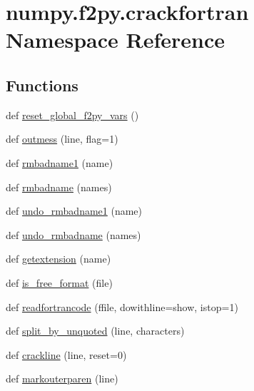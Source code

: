 \hypertarget{namespacenumpy_1_1f2py_1_1crackfortran}{}\section{numpy.\+f2py.\+crackfortran Namespace Reference}
\label{namespacenumpy_1_1f2py_1_1crackfortran}
\subsection*{Functions}
\begin{DoxyCompactItemize}
\item 
def \hyperlink{namespacenumpy_1_1f2py_1_1crackfortran_a33135ace878a349b007af87808e8f2fa}{reset\+\_\+global\+\_\+f2py\+\_\+vars} ()
\item 
def \hyperlink{namespacenumpy_1_1f2py_1_1crackfortran_af9c490156b4ea61844777f382ef248d2}{outmess} (line, flag=1)
\item 
def \hyperlink{namespacenumpy_1_1f2py_1_1crackfortran_a6db5f5a8ccbfc1231e62b777acc28d0b}{rmbadname1} (name)
\item 
def \hyperlink{namespacenumpy_1_1f2py_1_1crackfortran_ac9b1abc13f1aac19d19dc9547f5d4129}{rmbadname} (names)
\item 
def \hyperlink{namespacenumpy_1_1f2py_1_1crackfortran_af47e41ca814b0e36cea435150e36ee94}{undo\+\_\+rmbadname1} (name)
\item 
def \hyperlink{namespacenumpy_1_1f2py_1_1crackfortran_ac4b1af4ba10ee7aa78e8f09ae5220e71}{undo\+\_\+rmbadname} (names)
\item 
def \hyperlink{namespacenumpy_1_1f2py_1_1crackfortran_a36c57bf6d0cb566159c0eebb8127a334}{getextension} (name)
\item 
def \hyperlink{namespacenumpy_1_1f2py_1_1crackfortran_ada76bc2a84df7f6e459990f3184114a5}{is\+\_\+free\+\_\+format} (file)
\item 
def \hyperlink{namespacenumpy_1_1f2py_1_1crackfortran_a8309c5b8b51b4fb21d1920b2f3efdacc}{readfortrancode} (ffile, dowithline=show, istop=1)
\item 
def \hyperlink{namespacenumpy_1_1f2py_1_1crackfortran_a7a6252074e6d7fcddae35e4aaeb186c9}{split\+\_\+by\+\_\+unquoted} (line, characters)
\item 
def \hyperlink{namespacenumpy_1_1f2py_1_1crackfortran_a1efb637a0233ac82842d4ee56de2707d}{crackline} (line, reset=0)
\item 
def \hyperlink{namespacenumpy_1_1f2py_1_1crackfortran_ae512bdee315e86e789c952bb3461fa57}{markouterparen} (line)

\end{DoxyCompactItemize}
